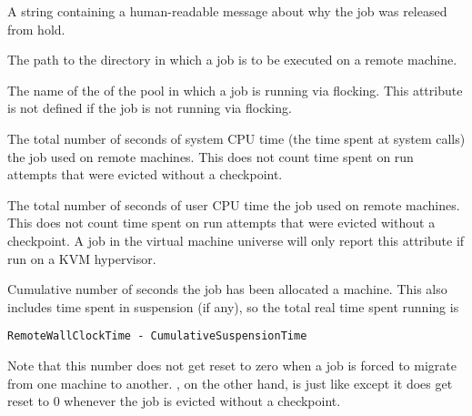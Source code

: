 \begin{description}
\item[\AdAttr{ReleaseReason}:]     A string containing a human-readable
message about why the job was released from hold.

\item[\AdAttr{RemoteIwd}:]  The path to the directory in which
a job is to be executed on a remote machine.

\item[\AdAttr{RemotePool}:]  The name of the  of the pool 
in which a job is running via flocking.  
This attribute is not defined if the job is not running via flocking.

\item[\AdAttr{RemoteSysCpu}:]  The total number of seconds
of system CPU time (the time spent at system calls) the job used
on remote machines.  This does not count time spent on run attempts that
were evicted without a checkpoint.

\item[\AdAttr{RemoteUserCpu}:]  The total number of seconds
of user CPU time the job used on remote machines.  This does not
count time spent on run attempts that were evicted without a checkpoint.
A job in the virtual machine universe will only report this attribute if run
on a KVM hypervisor.

\label{RemoteWallClockTime}
\item[\AdAttr{RemoteWallClockTime}:]  Cumulative number of seconds
the job has been allocated a machine.
This also includes time spent in suspension (if any),
so the total real time spent running is 
\begin{verbatim}
RemoteWallClockTime - CumulativeSuspensionTime
\end{verbatim}
Note that this number does not get reset to
zero when a job is forced to migrate from one machine to another.
, on the other hand, is just like
 except it does get reset to 0 whenever
the job is evicted without a checkpoint.


\end{description}
